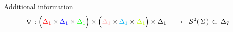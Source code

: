 \begin{frame}{\vskip -0.2cm \LARGE Additional information}
\scriptsize
\begin{equation*}
\Psi \, :
\left({\color{red}\Delta_{1}} \overset{{\color{white}.}}{\times} {\color{blue}\Delta_{1}} \times {\color{green}\Delta_{1}}\right)
\times
\left({\color{pink}\Delta_{1}} \overset{{\color{white}.}}{\times} {\color{cyan}\Delta_{1}} \times {\color{lime}\Delta_{1}}\right)
\times
\Delta_{1}
\;\;\longrightarrow\;\;
\mathcal{S}^{2}\!\left(\,\Sigma\,\right) \,\subset\, \Delta_{7}
\end{equation*}

\end{frame}
\normalsize

